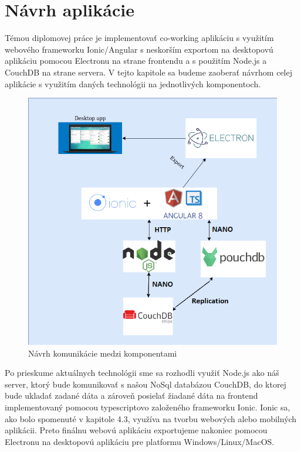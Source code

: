 \section{Návrh aplikácie}
\indent Témou diplomovej práce je implementovať co-working aplikáciu s využitím webového frameworku Ionic/Angular s neskorším exportom na desktopovú aplikáciu pomocou Electronu na strane frontendu a s použitím Node.js a CouchDB na strane servera. V tejto kapitole sa budeme zaoberať návrhom celej aplikácie s využitím daných technológii na jednotlivých komponentoch. 

\begin{figure}[H]
    \centering
    \includegraphics[scale=0.60]{img/diagram.png}
    \caption{Návrh komunikácie medzi komponentami}
    \label{fig:diagram}
\end{figure}

\indent Po prieskume aktuálnych technológii sme sa rozhodli využiť Node.js ako náš server, ktorý bude komunikovať s našou NoSql databázou CouchDB, do ktorej bude ukladať zadané dáta a zároveň posielať žiadané dáta na frontend implementovaný pomocou typescriptovo založeného frameworku Ionic. Ionic sa, ako bolo spomenuté v kapitole 4.3, využíva na tvorbu webových alebo mobilných aplikácii. Preto finálnu webovú aplikáciu exportujeme nakoniec pomocou Electronu na desktopovú aplikáciu pre platformu Windows/Linux/MacOS.


